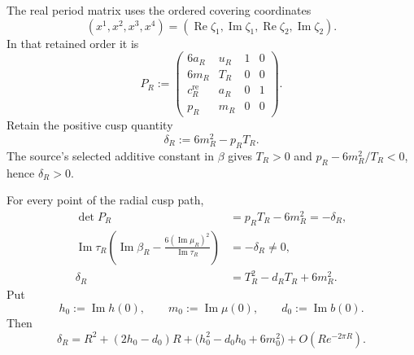 The real period matrix uses the ordered covering coordinates
\[
 (x^1,x^2,x^3,x^4)
 =
 (\operatorname{Re}\zeta_1,\operatorname{Im}\zeta_1,
  \operatorname{Re}\zeta_2,\operatorname{Im}\zeta_2).
\]
In that retained order it is
\begin{equation}\label{eq:s6cusp-real-period-matrix}
 P_R:=
 \begin{pmatrix}
  6a_R&u_R&1&0\\
  6m_R&T_R&0&0\\
  c_R^{\mathrm{re}}&a_R&0&1\\
  p_R&m_R&0&0
 \end{pmatrix}.
\end{equation}
Retain the positive cusp quantity
\begin{equation}\label{eq:s6cusp-delta}
 \delta_R:=6m_R^2-p_RT_R.
\end{equation}
The source's selected additive constant in \(\beta\) gives
\(T_R>0\) and
\(p_R-6m_R^2/T_R<0\), hence \(\delta_R>0\).

\begin{proposition}
\label{prop:s6cusp-determinant-expansion}
For every point of the radial cusp path,
\begin{align}
 \det P_R
 &=p_RT_R-6m_R^2=-\delta_R,
 \label{eq:s6cusp-det-period}\\
 \operatorname{Im}\tau_R
 \left(\operatorname{Im}\beta_R-
 \frac{6(\operatorname{Im}\mu_R)^2}
 {\operatorname{Im}\tau_R}\right)
 &=-\delta_R\ne0,
 \label{eq:s6cusp-unchanged-expression-delta}\\
 \delta_R
 &=T_R^2-d_RT_R+6m_R^2.
 \label{eq:s6cusp-delta-exact-radial}
\end{align}
Put
\begin{equation}\label{eq:s6cusp-boundary-values}
 h_0:=\operatorname{Im}h(0),\qquad
 m_0:=\operatorname{Im}\mu(0),\qquad
 d_0:=\operatorname{Im}b(0).
\end{equation}
Then
\begin{equation}\label{eq:s6cusp-delta-two-term-expansion}
 \delta_R=R^2+(2h_0-d_0)R+
 \bigl(h_0^2-d_0h_0+6m_0^2\bigr)
 +O\!\left(Re^{-2\pi R}\right).
\end{equation}
\end{proposition}

